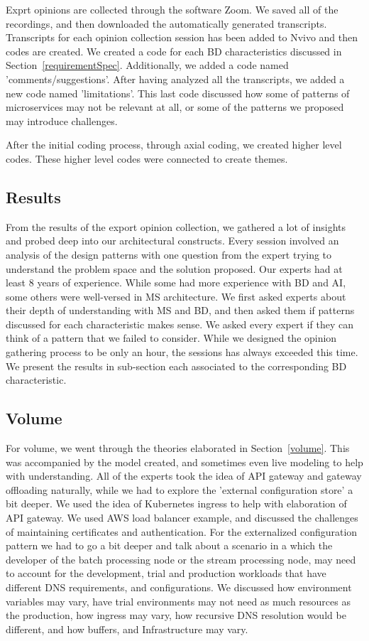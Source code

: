 \documentclass{bmcart}
\begin{document}
Exprt opinions are collected through the software Zoom. We saved all of the recordings, and then downloaded the automatically generated transcripts. Transcripts for each opinion collection session has been added to Nvivo and then codes are created. We created a code for each BD characteristics discussed in Section~\ref{requirementSpec}. Additionally, we added a code named 'comments/suggestions'. After having analyzed all the transcripts, we added a new code named 'limitations'. This last code discussed how some of patterns of microservices may not be relevant at all, or some of the patterns we proposed may introduce challenges. 

After the initial coding process, through axial coding, we created higher level codes. These higher level codes were connected to create themes. 


\subsection{Results}

From the results of the export opinion collection, we gathered a lot of insights and probed deep into our architectural constructs. Every session involved an analysis of the design patterns with one question from the expert trying to understand the problem space and the solution proposed. Our experts had at least 8 years of experience. While some had more experience with BD and AI, some others were well-versed in MS architecture. We first asked experts about their depth of understanding with MS and BD, and then asked them if patterns discussed for each characteristic makes sense. We asked every expert if they can think of a pattern that we failed to consider. While we designed the opinion gathering process to be only an hour, the sessions has always exceeded this time. We present the results in sub-section each associated to the corresponding BD characteristic.



\subsection{Volume}

For volume, we went through the theories elaborated in Section~\ref{volume}. This was accompanied by the model created, and sometimes even live modeling to help with understanding. All of the experts took the idea of API gateway and gateway offloading naturally, while we had to explore the 'external configuration store' a bit deeper. We used the idea of Kubernetes ingress to help with elaboration of API gateway. We used AWS load balancer example, and discussed the challenges of maintaining certificates and authentication. For the externalized configuration pattern we had to go a bit deeper and talk about a scenario in a which the developer of the batch processing node or the stream processing node, may need to account for the development, trial and production workloads that have different DNS requirements, and configurations. We discussed how environment variables may vary, have trial environments may not need as much resources as the production, how ingress may vary, how recursive DNS resolution would be different, and how buffers, and Infrastructure may vary. 
\end{document}
